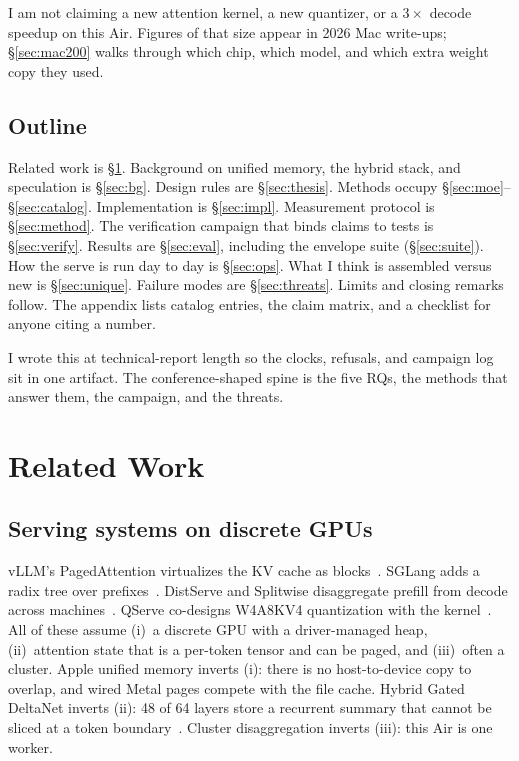 I am not claiming a new attention kernel, a new quantizer, or a $3\times$ decode speedup on this Air. Figures of that size appear in 2026 Mac write-ups; \S\ref{sec:mac200} walks through which chip, which model, and which extra weight copy they used.

\subsection{Outline}

Related work is \S\ref{sec:related}. Background on unified memory, the hybrid stack, and speculation is \S\ref{sec:bg}. Design rules are \S\ref{sec:thesis}. Methods occupy \S\ref{sec:moe}--\S\ref{sec:catalog}. Implementation is \S\ref{sec:impl}. Measurement protocol is \S\ref{sec:method}. The verification campaign that binds claims to tests is \S\ref{sec:verify}. Results are \S\ref{sec:eval}, including the envelope suite (\S\ref{sec:suite}). How the serve is run day to day is \S\ref{sec:ops}. What I think is assembled versus new is \S\ref{sec:unique}. Failure modes are \S\ref{sec:threats}. Limits and closing remarks follow. The appendix lists catalog entries, the claim matrix, and a checklist for anyone citing a number.

I wrote this at technical-report length so the clocks, refusals, and campaign log sit in one artifact. The conference-shaped spine is the five RQs, the methods that answer them, the campaign, and the threats.

\section{Related Work}
\label{sec:related}

\subsection{Serving systems on discrete GPUs}

vLLM's PagedAttention virtualizes the KV cache as blocks~\citep{kwon2023vllm}. SGLang adds a radix tree over prefixes~\citep{zheng2024sglang}. DistServe and Splitwise disaggregate prefill from decode across machines~\citep{zhong2024distserve,patel2024splitwise}. QServe co-designs W4A8KV4 quantization with the kernel~\citep{lin2024qserve}. All of these assume (i)~a discrete GPU with a driver-managed heap, (ii)~attention state that is a per-token tensor and can be paged, and (iii)~often a cluster. Apple unified memory inverts (i): there is no host-to-device copy to overlap, and wired Metal pages compete with the file cache. Hybrid Gated DeltaNet inverts (ii): 48 of 64 layers store a recurrent summary that cannot be sliced at a token boundary~\citep{yang2024gateddelta,gu2023mamba}. Cluster disaggregation inverts (iii): this Air is one worker.

